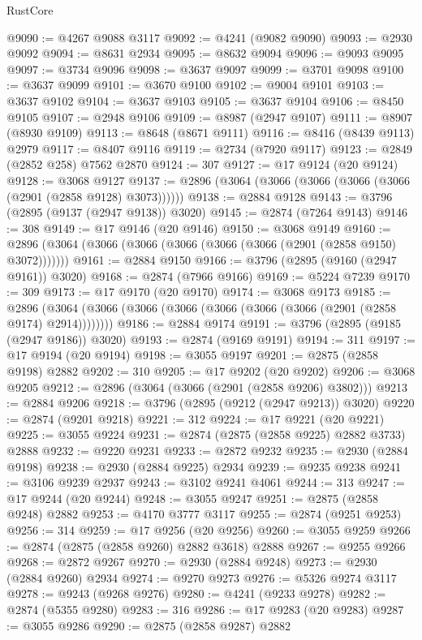 \begin{lexlean}{RustCore}
\begin{coremodule}
@9090 := @4267 @9088 @3117
@9092 := @4241 (@9082 @9090)
@9093 := @2930 @9092
@9094 := @8631 @2934
@9095 := @8632 @9094
@9096 := @9093 @9095
@9097 := @3734 @9096
@9098 := @3637 @9097
@9099 := @3701 @9098
@9100 := @3637 @9099
@9101 := @3670 @9100
@9102 := @9004 @9101
@9103 := @3637 @9102
@9104 := @3637 @9103
@9105 := @3637 @9104
@9106 := @8450 @9105
@9107 := @2948 @9106
@9109 := @8987 (@2947 @9107)
@9111 := @8907 (@8930 @9109)
@9113 := @8648 (@8671 @9111)
@9116 := @8416 (@8439 @9113) @2979
@9117 := @8407 @9116
@9119 := @2734 (@7920 @9117)
@9123 := @2849 (@2852 @258) @7562 @2870
@9124 := 307
@9127 := @17 @9124 (@20 @9124)
@9128 := @3068 @9127
@9137 := @2896 (@3064 (@3066 (@3066 (@3066 (@3066 (@2901 (@2858 @9128) @3073))))))
@9138 := @2884 @9128
@9143 := @3796 (@2895 (@9137 (@2947 @9138)) @3020)
@9145 := @2874 (@7264 @9143)
@9146 := 308
@9149 := @17 @9146 (@20 @9146)
@9150 := @3068 @9149
@9160 := @2896 (@3064 (@3066 (@3066 (@3066 (@3066 (@3066 (@2901 (@2858 @9150) @3072)))))))
@9161 := @2884 @9150
@9166 := @3796 (@2895 (@9160 (@2947 @9161)) @3020)
@9168 := @2874 (@7966 @9166)
@9169 := @5224 @7239
@9170 := 309
@9173 := @17 @9170 (@20 @9170)
@9174 := @3068 @9173
@9185 := @2896 (@3064 (@3066 (@3066 (@3066 (@3066 (@3066 (@3066 (@2901 (@2858 @9174) @2914))))))))
@9186 := @2884 @9174
@9191 := @3796 (@2895 (@9185 (@2947 @9186)) @3020)
@9193 := @2874 (@9169 @9191)
@9194 := 311
@9197 := @17 @9194 (@20 @9194)
@9198 := @3055 @9197
@9201 := @2875 (@2858 @9198) @2882
@9202 := 310
@9205 := @17 @9202 (@20 @9202)
@9206 := @3068 @9205
@9212 := @2896 (@3064 (@3066 (@2901 (@2858 @9206) @3802)))
@9213 := @2884 @9206
@9218 := @3796 (@2895 (@9212 (@2947 @9213)) @3020)
@9220 := @2874 (@9201 @9218)
@9221 := 312
@9224 := @17 @9221 (@20 @9221)
@9225 := @3055 @9224
@9231 := @2874 (@2875 (@2858 @9225) @2882 @3733) @2888
@9232 := @9220 @9231
@9233 := @2872 @9232
@9235 := @2930 (@2884 @9198)
@9238 := @2930 (@2884 @9225) @2934
@9239 := @9235 @9238
@9241 := @3106 @9239 @2937
@9243 := @3102 @9241 @4061
@9244 := 313
@9247 := @17 @9244 (@20 @9244)
@9248 := @3055 @9247
@9251 := @2875 (@2858 @9248) @2882
@9253 := @4170 @3777 @3117
@9255 := @2874 (@9251 @9253)
@9256 := 314
@9259 := @17 @9256 (@20 @9256)
@9260 := @3055 @9259
@9266 := @2874 (@2875 (@2858 @9260) @2882 @3618) @2888
@9267 := @9255 @9266
@9268 := @2872 @9267
@9270 := @2930 (@2884 @9248)
@9273 := @2930 (@2884 @9260) @2934
@9274 := @9270 @9273
@9276 := @5326 @9274 @3117
@9278 := @9243 (@9268 @9276)
@9280 := @4241 (@9233 @9278)
@9282 := @2874 (@5355 @9280)
@9283 := 316
@9286 := @17 @9283 (@20 @9283)
@9287 := @3055 @9286
@9290 := @2875 (@2858 @9287) @2882

\end{coremodule}
\end{lexlean}
